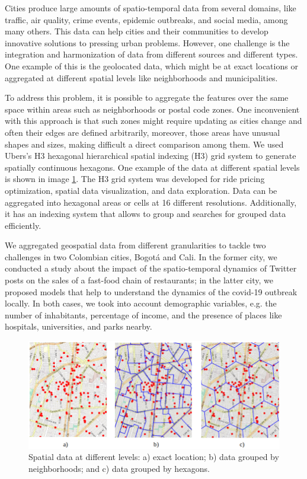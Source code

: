 \documentclass{article}
\begin{document}
Cities produce large amounts of spatio-temporal data from several domains, like traffic, air quality, crime events, epidemic outbreaks, and social media, among many others. This data can help cities and their communities to develop innovative solutions to pressing urban problems. However, one challenge is the integration and harmonization of data from different sources and different types. One example of this is the geolocated data, which might be at exact locations or aggregated at different spatial levels like neighborhoods and municipalities.

To address this problem, it is possible to aggregate the features over the same space within areas such as neighborhoods or postal code zones. One inconvenient with this approach is that such zones might require updating as cities change and often their edges are defined arbitrarily, moreover, those areas have unusual shapes and sizes, making difficult a direct comparison among them. We used Ubers's H3 hexagonal hierarchical spatial indexing (H3) grid system \cite{uber2019} to generate spatially continuous hexagons. One example of the data at different spatial levels is shown in image \ref{fig:spatialLevels}. The H3 grid system was developed for ride pricing optimization, spatial data visualization, and data exploration. Data can be aggregated into hexagonal areas or cells at 16 different resolutions. Additionally, it has an indexing system that allows to group and searches for grouped data efficiently.

We aggregated geospatial data from different granularities to tackle two challenges in two Colombian cities, Bogotá and Cali. In the former city, we conducted a study about the impact of the spatio-temporal dynamics of Twitter posts on the sales of a fast-food chain of restaurants; in the latter city, we proposed models that help to understand the dynamics of the covid-19 outbreak locally. In both cases, we took into account demographic variables, e.g. the number of inhabitants, percentage of income, and the presence of places like hospitals, universities, and parks nearby.

\begin{figure}[ptb]
    \centering
    \includegraphics[width=.95\linewidth]{imgs/geolocations}
    \caption{Spatial data at different levels: a) exact location; b) data grouped by neighborhoods; and c) data grouped by hexagons.}
    \label{fig:spatialLevels}
\end{figure}

 

\end{document}
